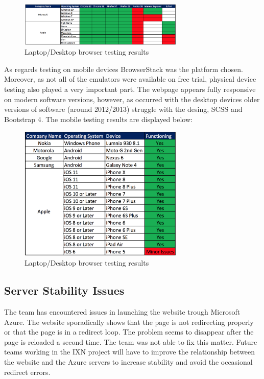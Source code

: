\documentclass[fontsize=10pt]{extarticle}
\numberwithin{figure}{section} %
\begin{document}
\begin{figure}[H]
      \centering
      \includegraphics[trim = 0 0 0 0, clip, width=0.7\textwidth]{ph7.png}
      \caption{Laptop/Desktop browser testing results}
 \end{figure}

As regards testing on mobile devices BrowserStack was the platform
chosen. Moreover, as not all of the emulators were available on free
trial, physical device testing also played a very important part. The
webpage appears fully responsive on modern software versions, however,
as occurred with the desktop devices older versions of software (around
2012/2013) struggle with the desing, SCSS and Bootstrap 4. The mobile
testing results are displayed below:

\begin{figure}[H]
      \centering
      \includegraphics[trim = 0 0 0 0, clip, width=0.7\textwidth]{ph8.png}
      \caption{Laptop/Desktop browser testing results}
 \end{figure}

\hypertarget{server-stability-issues}{%
\subsection{Server Stability Issues}\label{server-stability-issues}}

The team has encountered issues in launching the website trough
Microsoft Azure. The website sporadically shows that the page is not
redirecting properly or that the page is in a redirect loop. The problem
seems to disappear after the page is reloaded a second time. The team
was not able to fix this matter. Future teams working in the IXN project
will have to improve the relationship between the website and the Azure
servers to increase stability and avoid the occasional redirect errors.
\end{document}

